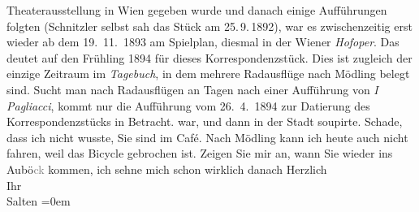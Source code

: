 \begin{ledgroupsized}[t]{13cm}
{{{{                        Theaterausstellung} in Wien
                  gegeben wurde und danach einige Aufführungen folgten (Schnitzler selbst sah das Stück am 25. 9. 1892), war es zwischenzeitig erst wieder ab dem 19. 11. 1893
                  am Spielplan, diesmal in der Wiener 
                  \emph{Hofoper}. Das deutet auf den Frühling 1894 für dieses Korrespondenzstück.
                  Dies ist zugleich der einzige Zeitraum im \emph{Tagebuch}, 
                  in dem mehrere Radausflüge nach Mödling belegt sind.
                  Sucht man nach Radausflügen an Tagen nach einer Aufführung von \emph{I Pagliacci}, kommt 
                  nur die Aufführung vom 26. 4. 1894 zur Datierung des
                  Korrespondenzstücks in Betracht.}}}\label{K_L03120-1h} war, und dann in der Stadt soupirte. Schade, dass ich nicht wusste, Sie sind im Café.
               Nach Mödling kann ich heute auch nicht {\pb}fahren, weil das Bicycle gebrochen ist. Zeigen Sie mir an, wann Sie wieder ins Aubö\textcolor{gray}{ck} kommen, ich sehne mich schon wirklich danach\pend
           \pstart
           Herzlich {\\[\baselineskip]}Ihr {\\[\baselineskip]}\spacefill\mbox{Salten}\pend
           \leftskip=0em{}
         
         \endnumbering{}\end{ledgroupsized}  \newcommand{\dateiname}{L03120}\newcommand{\titel}{Felix Salten an Arthur Schnitzler, [27. 4. 1894?]}\newcommand{\editorInnen}{Martin Anton Müller und Laura Untner}
      